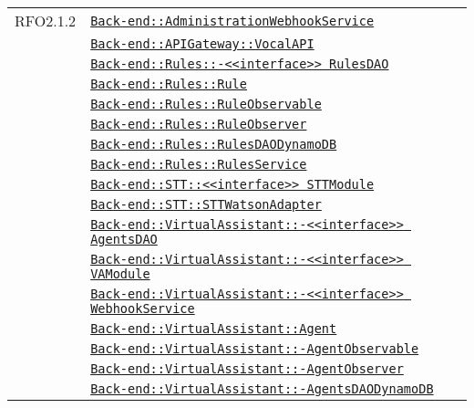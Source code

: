 \begin{longtable}{|>{\centering}m{3cm}|m{10cm}<{\centering}|}
RFO2.1.2 & \hyperref[Back-end::AdministrationWebhookService]{\texttt{Back-end::AdministrationWebhookService}}\\
& \hyperref[Back-end::APIGateway::VocalAPI]{\texttt{Back-end::APIGateway::VocalAPI}}\\
& \hyperref[Back-end::Rules::<<interface>> RulesDAO]{\texttt{Back-end::Rules::-\linebreak <<interface>> RulesDAO}}\\
& \hyperref[Back-end::Rules::Rule]{\texttt{Back-end::Rules::Rule}}\\
& \hyperref[Back-end::Rules::RuleObservable]{\texttt{Back-end::Rules::RuleObservable}}\\
& \hyperref[Back-end::Rules::RuleObserver]{\texttt{Back-end::Rules::RuleObserver}}\\
& \hyperref[Back-end::Rules::RulesDAODynamoDB]{\texttt{Back-end::Rules::RulesDAODynamoDB}}\\
& \hyperref[Back-end::Rules::RulesService]{\texttt{Back-end::Rules::RulesService}}\\
& \hyperref[Back-end::STT::<<interface>> STTModule]{\texttt{Back-end::STT::<<interface>> STTModule}}\\
& \hyperref[Back-end::STT::STTWatsonAdapter]{\texttt{Back-end::STT::STTWatsonAdapter}}\\
& \hyperref[Back-end::VirtualAssistant::<<interface>> AgentsDAO]{\texttt{Back-end::VirtualAssistant::-\linebreak <<interface>> AgentsDAO}}\\
& \hyperref[Back-end::VirtualAssistant::<<interface>> VAModule]{\texttt{Back-end::VirtualAssistant::-\linebreak <<interface>> VAModule}}\\
& \hyperref[Back-end::VirtualAssistant::<<interface>> WebhookService]{\texttt{Back-end::VirtualAssistant::-\linebreak <<interface>> WebhookService}}\\
& \hyperref[Back-end::VirtualAssistant::Agent]{\texttt{Back-end::VirtualAssistant::Agent}}\\
& \hyperref[Back-end::VirtualAssistant::AgentObservable]{\texttt{Back-end::VirtualAssistant::-\linebreak AgentObservable}}\\
& \hyperref[Back-end::VirtualAssistant::AgentObserver]{\texttt{Back-end::VirtualAssistant::-\linebreak AgentObserver}}\\
& \hyperref[Back-end::VirtualAssistant::AgentsDAODynamoDB]{\texttt{Back-end::VirtualAssistant::-\linebreak AgentsDAODynamoDB}}\\

\end{longtable}
